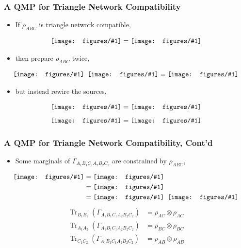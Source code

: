\documentclass[
    9pt,
    hyperref={bookmarks=false, colorlinks=false}, %
    xcolor={dvipsnames},
]{beamer}
\DeclareMathOperator{\Tr}{Tr}
\newcommand{\incstr}[1]{\vcenter{\hbox{\texttt{[image: figures/\#1]}}}} %
\begin{document}
\begin{frame}
    \frametitle{A QMP for Triangle Network Compatibility}
    \begin{itemize}
        \item If $\rho_{ABC}$ is triangle network compatible,
    \end{itemize}
    \[ \incstr{triangle_state.pdf} = \incstr{triangle_production.pdf} \]
    \begin{itemize}
        \item then prepare $\rho_{ABC}$ twice,
    \end{itemize}
    \[ \incstr{triangle_state.pdf}\hspace{0.5em}\incstr{triangle_state.pdf} = \incstr{triangle_production_double.pdf} \]
    \begin{itemize}
        \item but instead rewire the sources,
    \end{itemize}
    \[ \incstr{triangle_sextuple.pdf} = \incstr{triangle_production_ring.pdf} \]
    \[ \incstr{triangle_sextuple.pdf} = \incstr{triangle_sextuple_swap.pdf} \]
\end{frame}

\begin{frame}
    \frametitle{A QMP for Triangle Network Compatibility, Cont'd}
    \begin{itemize}
        \item Some marginals of $\Gamma_{A_1B_1C_1A_2B_2C_2}$ are constrained by $\rho_{ABC}$,
    \end{itemize}
    \begin{align*}
        \incstr{triangle_sextuple_discard.pdf} 
        &= \incstr{triangle_production_ring_discard.pdf} \\
        &= \incstr{triangle_production_ring_discard_pulldown.pdf} \\
        &= \incstr{triangle_marg_state_Ac.pdf} \hspace{0.5em}\incstr{triangle_marg_state_Ac.pdf}
    \end{align*}
    \begin{align*}
        \Tr_{B_1B_2}(\Gamma_{A_1B_1C_1A_2B_2C_2}) &= \rho_{AC} \otimes \rho_{AC} \\
        \Tr_{A_1A_2}(\Gamma_{A_1B_1C_1A_2B_2C_2}) &= \rho_{BC} \otimes \rho_{BC} \\
        \Tr_{C_1C_2}(\Gamma_{A_1B_1C_1A_2B_2C_2}) &= \rho_{AB} \otimes \rho_{AB}
    \end{align*}
\end{frame}
\end{document}
